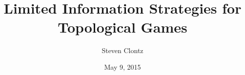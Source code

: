 \documentclass[12pt]{report}
\title{Limited Information Strategies for Topological Games}
\author{Steven Clontz}
\date{May 9, 2015} %
\theoremstyle{definition}
\begin{document}
\begin{romanpages}      %

\TitlePage




\tableofcontents
\listoffigures

\printnomenclature[0.5in] %
\end{romanpages}        %


\normalem       %












% 
\end{document}

